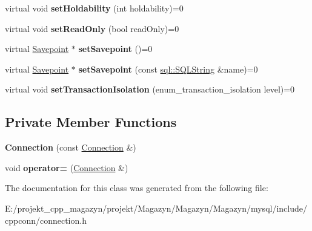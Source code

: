 \begin{DoxyCompactItemize}
\hypertarget{classsql_1_1_connection_a40ad3e1eb922007b79734e87b5dd428b}{}\label{classsql_1_1_connection_a40ad3e1eb922007b79734e87b5dd428b} 
virtual void {\bfseries set\+Holdability} (int holdability)=0
\item 
\hypertarget{classsql_1_1_connection_aaaa23e9c88ec232e3bcdbbf56e81184e}{}\label{classsql_1_1_connection_aaaa23e9c88ec232e3bcdbbf56e81184e} 
virtual void {\bfseries set\+Read\+Only} (bool read\+Only)=0
\item 
\hypertarget{classsql_1_1_connection_aa9f59b2b67db3783f9669a458e74654b}{}\label{classsql_1_1_connection_aa9f59b2b67db3783f9669a458e74654b} 
virtual \hyperlink{classsql_1_1_savepoint}{Savepoint} $\ast$ {\bfseries set\+Savepoint} ()=0
\item 
\hypertarget{classsql_1_1_connection_ae1b5ee8edc062cb3c510eea6be7d6bdc}{}\label{classsql_1_1_connection_ae1b5ee8edc062cb3c510eea6be7d6bdc} 
virtual \hyperlink{classsql_1_1_savepoint}{Savepoint} $\ast$ {\bfseries set\+Savepoint} (const \hyperlink{classsql_1_1_s_q_l_string}{sql\+::\+S\+Q\+L\+String} \&name)=0
\item 
\hypertarget{classsql_1_1_connection_ac9d4593132f11fc701398c68d4baef5f}{}\label{classsql_1_1_connection_ac9d4593132f11fc701398c68d4baef5f} 
virtual void {\bfseries set\+Transaction\+Isolation} (enum\+\_\+transaction\+\_\+isolation level)=0
\end{DoxyCompactItemize}
\subsection*{Private Member Functions}
\begin{DoxyCompactItemize}
\item 
\hypertarget{classsql_1_1_connection_a0ca42318e5b1a908c53fec07ac33c21a}{}\label{classsql_1_1_connection_a0ca42318e5b1a908c53fec07ac33c21a} 
{\bfseries Connection} (const \hyperlink{classsql_1_1_connection}{Connection} \&)
\item 
\hypertarget{classsql_1_1_connection_a02c6d4b13305ddab8e88a6d426bd7718}{}\label{classsql_1_1_connection_a02c6d4b13305ddab8e88a6d426bd7718} 
void {\bfseries operator=} (\hyperlink{classsql_1_1_connection}{Connection} \&)
\end{DoxyCompactItemize}


The documentation for this class was generated from the following file\+:\begin{DoxyCompactItemize}
\item 
E\+:/projekt\+\_\+cpp\+\_\+magazyn/projekt/\+Magazyn/\+Magazyn/\+Magazyn/mysql/include/cppconn/connection.\+h\end{DoxyCompactItemize}
